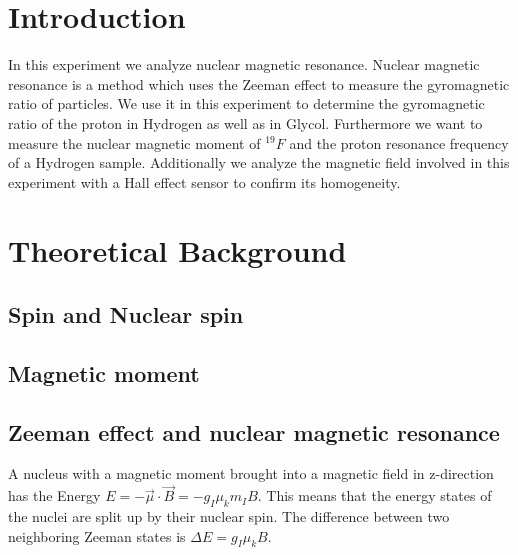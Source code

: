 \documentclass[12pt]{article}
\title{\vspace{0cm}{\Huge Fortgeschrittenen-Praktikum I:\\ \vspace{1cm} Nuclear Magnetic Resonance}}
\author{Saskia Bondza\\Simon Stephan}
\date{performed on 15.09.2016 and 16.09.2016}
\begin{document}
\maketitle
\newpage

\thispagestyle{empty}
\tableofcontents
\newpage

\section{Introduction}


In this experiment we analyze nuclear magnetic resonance. Nuclear magnetic resonance is a method which uses the Zeeman effect to measure the gyromagnetic ratio of particles. We use it in this experiment to determine the gyromagnetic ratio of the proton in Hydrogen as well as in Glycol. Furthermore we want to measure the nuclear magnetic moment of $^{19}F$ and the proton resonance frequency of a Hydrogen sample. Additionally we analyze the magnetic field involved in this experiment with a Hall effect sensor to confirm its homogeneity.



\newpage
\section{Theoretical Background}
\subsection{Spin and Nuclear spin}

\subsection{Magnetic moment}

\subsection{Zeeman effect and nuclear magnetic resonance}
A nucleus with a magnetic moment brought into a magnetic field in z-direction has the Energy $E=-\vec\mu\cdot\vec B=-g_I\mu_km_IB$. This means that the energy states of the nuclei are split up by their nuclear spin. The difference between two neighboring Zeeman states is $\Delta E=g_I\mu_kB$.
\end{document}
